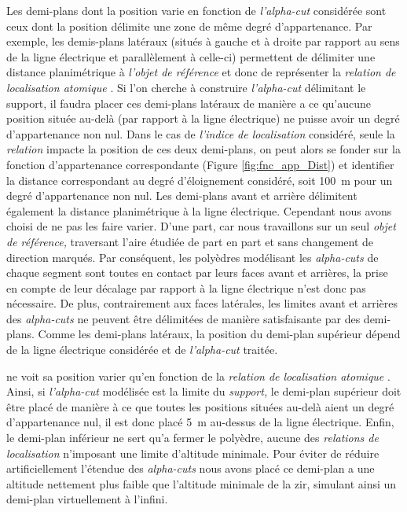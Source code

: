 Les demi-plans dont la position varie en fonction de \emph{l'alpha-cut} considérée sont ceux dont la position délimite une zone de même degré d'appartenance. Par exemple, les demis-plans latéraux (\ie situés à gauche et à droite par rapport au sens de la ligne électrique et parallèlement à celle-ci) permettent de délimiter une distance planimétrique à \emph{l'objet de référence} et donc de représenter la \emph{relation de localisation atomique} . Si l'on cherche à construire \emph{l'alpha-cut} délimitant le support, il faudra placer ces demi-plans latéraux de manière a ce qu'aucune position située au-delà (par rapport à la ligne électrique) ne puisse avoir un degré d'appartenance non nul. Dans le cas de \emph{l'indice de localisation} considéré, seule la \emph{relation}  impacte la position de ces deux demi-plans, on peut alors se fonder sur la fonction d'appartenance correspondante (Figure \ref{fig:fnc_app_Dist}) et identifier la distance correspondant au degré d'éloignement considéré, soit \SI{100}{\meter} pour un degré d'appartenance non nul. Les demi-plans avant et arrière délimitent également la distance planimétrique à la ligne électrique. Cependant nous avons choisi de ne pas les faire varier. D'une part, car nous travaillons sur un seul \emph{objet de référence,} traversant l'aire étudiée de part en part et sans changement de direction marqués. Par conséquent, les polyèdres modélisant les \emph{alpha-cuts} de chaque segment sont toutes en contact par leurs faces avant et arrières, la prise en compte de leur décalage par rapport à la ligne électrique n'est donc pas nécessaire. De plus, contrairement aux faces latérales, les limites avant et arrières des \emph{alpha-cuts} ne peuvent être délimitées de manière satisfaisante par des demi-plans.
% 
Comme les demi-plans latéraux, la position du demi-plan supérieur dépend de la ligne électrique considérée et de \emph{l'alpha-cut} traitée.

ne voit sa position varier qu'en fonction de la \emph{relation de localisation atomique} . Ainsi, si \emph{l'alpha-cut} modélisée est la limite du \emph{support,} le demi-plan supérieur doit être placé de manière à ce que toutes les positions situées au-delà aient un degré d'appartenance nul, il est donc placé \SI{5}{\meter} au-dessus de la ligne électrique. 
Enfin, le demi-plan inférieur ne sert qu'a fermer le polyèdre, aucune des \emph{relations de localisation} n'imposant une limite d'altitude minimale. Pour éviter de réduire artificiellement l'étendue des \emph{alpha-cuts} nous avons placé ce demi-plan a une altitude nettement plus faible que l'altitude minimale de la zir, simulant ainsi un demi-plan virtuellement à l'infini.

